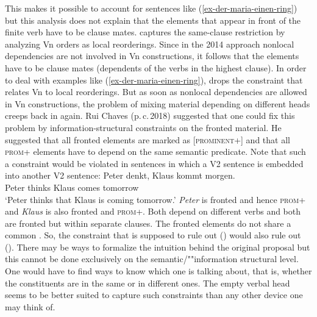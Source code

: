 \begin{exe}
\begin{xlist}
This makes it possible to account for sentences like (\ref{ex-der-maria-einen-ring}) but this analysis does not explain that the elements that
appear in front of the finite verb have to be clause mates.  captures
the same-clause restriction by analyzing Vn orders as local reorderings. Since in the 2014 approach nonlocal dependencies
are not involved in Vn constructions, it follows that the elements have to be clause mates
(dependents of the verbs in the highest clause). In order to deal with examples like (\ref{ex-der-maria-einen-ring}), \citet{Wetta2018a} drops the constraint that relates Vn to local reorderings. But as soon as
nonlocal dependencies are allowed in Vn constructions, the problem of mixing material depending on
different heads creeps back in again. Rui Chaves (p.\,c.\,2018) suggested that
one could fix this problem by information-structural constraints on the fronted material. He
suggested that all fronted elements are marked as [\textsc{prominent}+] and that all \textsc{prom}+
elements have to depend on the same semantic predicate. Note that such a constraint would be violated
in sentences in which a V2 sentence is embedded into another V2 sentence:
\ea
\gll Peter denkt, Klaus kommt morgen.\\
     Peter thinks Klaus comes tomorrow\\
\glt `Peter thinks that Klaus is coming tomorrow.'
\z
\emph{Peter} is fronted and hence \textsc{prom}+ and \emph{Klaus} is also fronted and
\textsc{prom}+. Both depend on different verbs and both are fronted but within separate
clauses. The fronted elements do not share a common \vf. So, the constraint that is supposed to rule
out () would also rule out ().
\z
There may be ways to formalize the intuition behind the original proposal but this cannot be done
exclusively on the semantic/""information structural level. One would have to find ways to know which
\vf one is talking about, that is, whether the constituents are in the same \vf or in different
ones. The empty verbal head seems to be better suited to capture such constraints than any other
device one may think of.
%
%


\end{xlist}
\end{exe}
